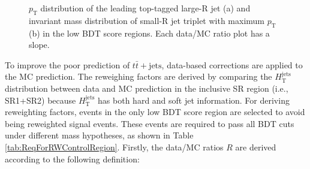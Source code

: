 \begin{figure}[H]
  \caption{$p_{\text{T}}$ distribution of the leading top-tagged large-R jet (a) and invariant mass distribution of small-R jet triplet with maximum $p_{\text{T}}$ (b) in the low BDT score regions. Each data/MC ratio plot has a slope.}
  \label{fig:DataMCComparison_In_LowBDTSocreRegion}
\end{figure}


To improve the poor prediction of $t\bar{t}+\text{jets}$, data-based corrections are applied to the MC prediction. The reweighing factors are derived by comparing the $H_{\text{T}}^{\text{jets}}$ distribution between data and MC prediction in the inclusive SR region (i.e., SR1+SR2) because $H_{\text{T}}^{\text{jets}}$ has both hard and soft jet information. For deriving reweighting factors, events in the only low BDT score region are selected to avoid being reweighted signal events. These events are required to pass all BDT cuts under different mass hypotheses, as shown in Table \ref{tab:ReqForRWControlRegion}. Firstly, the data/MC ratios $R$ are derived according to the following definition:

